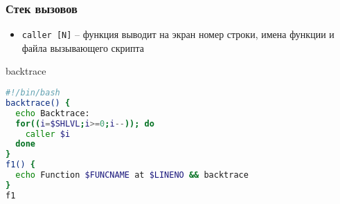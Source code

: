 \begin{frame}[fragile]
	\frametitle{Стек вызовов}

	\begin{itemize}
		\item {\tt caller [N]} -- функция выводит на экран номер строки, имена функции и файла вызывающего скрипта
	\end{itemize}

	\begin{block}{backtrace}
		\begin{lstlisting}[language=sh]
#!/bin/bash
backtrace() {
  echo Backtrace:
  for((i=$SHLVL;i>=0;i--)); do
    caller $i
  done
}
f1() {
  echo Function $FUNCNAME at $LINENO && backtrace
}
f1
		\end{lstlisting}
	\end{block}

\end{frame}

